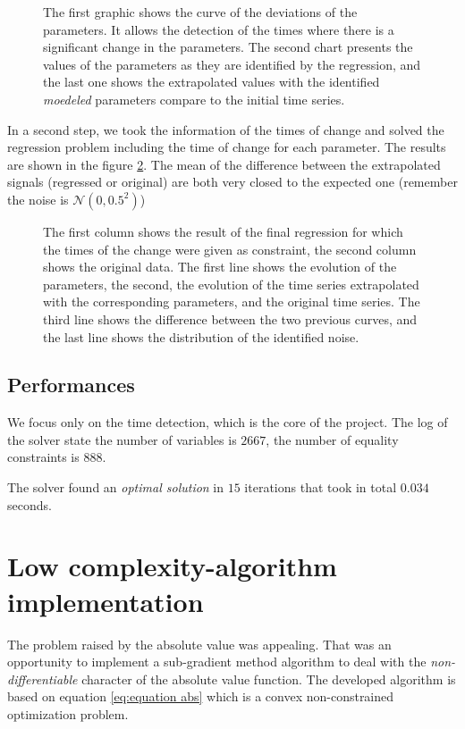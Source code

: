 \documentclass[11pt]{article}
\begin{document}
    \begin{figure}[h]
        \centering
        
        \caption{\label{fig:ipopt_time_detection} The first graphic shows the curve of the deviations of the parameters. It allows the detection of the times where there is a significant change in the parameters. The second chart presents the values of the parameters as they are identified by the regression, and the last one shows the extrapolated values with the identified \emph{moedeled} parameters compare to the initial time series.}
    \end{figure}

    In a second step, we took the information of the times of change and solved the regression problem including the time of change for each parameter. The results are shown in the figure \ref{fig:final regression}.
    The mean of the difference between the extrapolated signals (regressed or original) are both very closed to the expected one (remember the noise is $\mathcal{N}(0, 0.5^2)$)

    \begin{figure}[h]
        \centering
        
        \caption{\label{fig:final regression} The first column shows the result of the final regression for which the times of the change were given as constraint, the second column shows the original data. The first line shows the evolution of the parameters, the second, the evolution of the time series extrapolated with the corresponding parameters, and the original time series. The third line shows the difference between the two previous curves, and the last line shows the distribution of the identified noise.}
    \end{figure}

    \subsection{Performances}
        We focus only on the time detection, which is the core of the project. The log of the solver state the number of variables is $2667$, the number of equality constraints is $888$.

        The solver found an \emph{optimal solution} in $15$ iterations that took in total $0.034$ seconds.

\section{Low complexity-algorithm implementation}
    The problem raised by the absolute value was appealing. That was an opportunity to implement a sub-gradient method algorithm to deal with the \emph{non-differentiable} character of the absolute value function. The developed algorithm is based on equation \ref{eq:equation abs} which is a convex non-constrained optimization problem.
\end{document}
